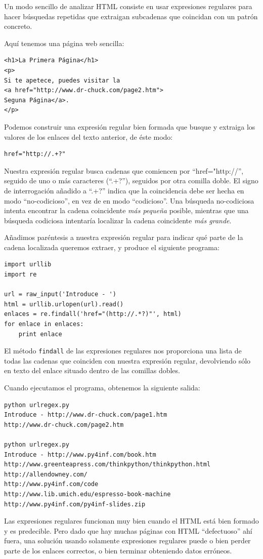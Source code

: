 Un modo sencillo de analizar HTML consiste en usar expresiones regulares para
hacer búsquedas repetidas que extraigan subcadenas que coincidan con un patrón concreto.

Aquí tenemos una página web sencilla:

\beforeverb
\begin{verbatim}
<h1>La Primera Página</h1>
<p>
Si te apetece, puedes visitar la
<a href="http://www.dr-chuck.com/page2.htm">
Seguna Página</a>.
</p>
\end{verbatim}
\afterverb
%
Podemos construir una expresión regular bien formada que busque
y extraiga los valores de los enlaces del texto anterior, de éste modo:

\beforeverb
\begin{verbatim}
href="http://.+?"
\end{verbatim}
\afterverb
%
Nuestra expresión regular busca cadenas que comiencen por
``href="http://'', seguido de uno o más caracteres
(``.+?''), seguidos por otra comilla doble. El signo de interrogación
añadido a ``.+?'' indica que la coincidencia debe ser hecha
en modo ``no-codicioso'', en vez de en modo ``codicioso''.
Una búsqueda no-codiciosa intenta encontrar la cadena coincidente
{\em más pequeña} posible, mientras que una búsqueda codiciosa intentaría
localizar la cadena coincidente {\em más grande}.

Añadimos paréntesis a nuestra expresión regular para indicar
qué parte de la cadena localizada queremos extraer, y
produce el siguiente programa:

\beforeverb
\begin{verbatim}
import urllib
import re

url = raw_input('Introduce - ')
html = urllib.urlopen(url).read()
enlaces = re.findall('href="(http://.*?)"', html)
for enlace in enlaces:
    print enlace
\end{verbatim}
\afterverb
%
El método {\tt findall} de las expresiones regulares nos proporciona una lista de todas
las cadenas que coinciden con nuestra expresión regular, devolviendo sólo
en texto del enlace situado dentro de las comillas dobles.

Cuando ejecutamos el programa, obtenemos la siguiente salida:

\beforeverb
\begin{verbatim}
python urlregex.py 
Introduce - http://www.dr-chuck.com/page1.htm
http://www.dr-chuck.com/page2.htm

python urlregex.py 
Introduce - http://www.py4inf.com/book.htm
http://www.greenteapress.com/thinkpython/thinkpython.html
http://allendowney.com/
http://www.py4inf.com/code
http://www.lib.umich.edu/espresso-book-machine
http://www.py4inf.com/py4inf-slides.zip
\end{verbatim}
\afterverb
%
Las expresiones regulares funcionan muy bien cuando el HTML está bien formado
y es predecible. Pero dado que hay muchas páginas con HTML ``defectuoso''
ahí fuera, una solución usando solamente expresiones regulares puede o bien
perder parte de los enlaces correctos, o bien terminar obteniendo datos erróneos.

